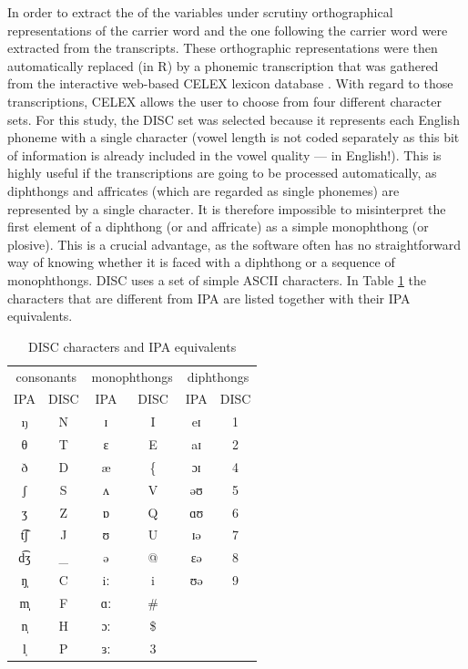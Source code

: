 In order to extract the  of the variables under scrutiny orthographical representations of the carrier word and the one following the carrier word were extracted from the transcripts.
These orthographic representations were then automatically replaced (in R) by a phonemic transcription that was gathered from the interactive web-based CELEX lexicon database \parencite{baayenetal1993}.
With regard to those transcriptions, CELEX allows the user to choose from four different character sets.
For this study, the DISC set was selected because it represents each English phoneme with a single character (vowel length is not coded separately as this bit of information is already included in the vowel quality --- in English!).
This is highly useful if the transcriptions are going to be processed automatically, as diphthongs and affricates (which are regarded as single phonemes) are represented by a single character.
It is therefore impossible to misinterpret the first element of a diphthong (or and affricate) as a simple monophthong (or plosive).
This is a crucial advantage, as the software often has no straightforward way of knowing whether it is faced with a diphthong or a sequence of monophthongs.
DISC uses a set of simple ASCII characters.
In Table \ref{tab.DISC} the characters that are different from IPA are listed together with their IPA equivalents.

	\begin{table}[h]
		\centering
		\caption{DISC characters and IPA equivalents}
		\begin{tabular}{cccccc}
			\hline
			\multicolumn{2}{c}{consonants} & \multicolumn{2}{c}{monophthongs} & \multicolumn{2}{c}{diphthongs}\\
			IPA & DISC & IPA & DISC & IPA & DISC\\
			\hline
			ŋ & N & ɪ & I & eɪ & 1\\
			θ & T & ɛ & E & aɪ & 2\\
			ð & D & æ & \{ & ɔɪ & 4\\
			ʃ & S & ʌ & V & əʊ & 5\\
			ʒ & Z & ɒ & Q & ɑʊ & 6\\
			t͡ʃ & J & ʊ & U & ɪə & 7\\
			d͡ʒ & \_ & ə & @ & ɛə & 8\\
			ŋ̩ & C & iː & i & ʊə & 9\\
			m̩̩ & F & ɑː & \# &&\\
			n̩ & H & ɔː & \$ &&\\
			l̩ & P & ɜː & 3 &&\\
			\hline
		\end{tabular}
		\label{tab.DISC}
	\end{table}

